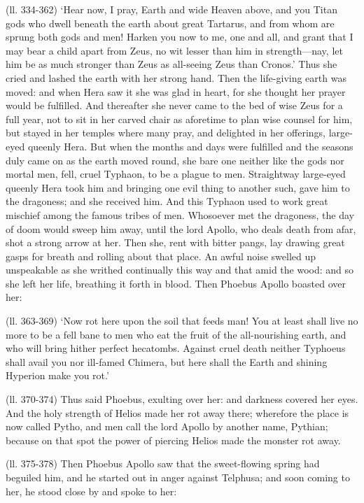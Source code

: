 (ll. 334-362) ‘Hear now, I pray, Earth and wide Heaven above, and you
Titan gods who dwell beneath the earth about great Tartarus, and from whom are
sprung both gods and men! Harken you now to me, one and all, and grant that I
may bear a child apart from Zeus, no wit lesser than him in strength—nay,
let him be as much stronger than Zeus as all-seeing Zeus than Cronos.’
Thus she cried and lashed the earth with her strong hand. Then the life-giving
earth was moved: and when Hera saw it she was glad in heart, for she thought
her prayer would be fulfilled. And thereafter she never came to the bed of wise
Zeus for a full year, not to sit in her carved chair as aforetime to plan wise
counsel for him, but stayed in her temples where many pray, and delighted in
her offerings, large-eyed queenly Hera. But when the months and days were
fulfilled and the seasons duly came on as the earth moved round, she bare one
neither like the gods nor mortal men, fell, cruel Typhaon, to be a plague to
men. Straightway large-eyed queenly Hera took him and bringing one evil thing
to another such, gave him to the dragoness; and she received him. And this
Typhaon used to work great mischief among the famous tribes of men. Whosoever
met the dragoness, the day of doom would sweep him away, until the lord Apollo,
who deals death from afar, shot a strong arrow at her. Then she, rent with
bitter pangs, lay drawing great gasps for breath and rolling about that place.
An awful noise swelled up unspeakable as she writhed continually this way and
that amid the wood: and so she left her life, breathing it forth in blood. Then
Phoebus Apollo boasted over her:

(ll. 363-369) ‘Now rot here upon the soil that feeds man! You at least
shall live no more to be a fell bane to men who eat the fruit of the
all-nourishing earth, and who will bring hither perfect hecatombs. Against
cruel death neither Typhoeus shall avail you nor ill-famed Chimera, but here
shall the Earth and shining Hyperion make you rot.’

(ll. 370-374) Thus said Phoebus, exulting over her: and darkness covered her
eyes. And the holy strength of Helios made her rot away there; wherefore the
place is now called Pytho, and men call the lord Apollo by another name,
Pythian; because on that spot the power of piercing Helios made the monster rot
away.

(ll. 375-378) Then Phoebus Apollo saw that the sweet-flowing spring had
beguiled him, and he started out in anger against Telphusa; and soon coming to
her, he stood close by and spoke to her:

